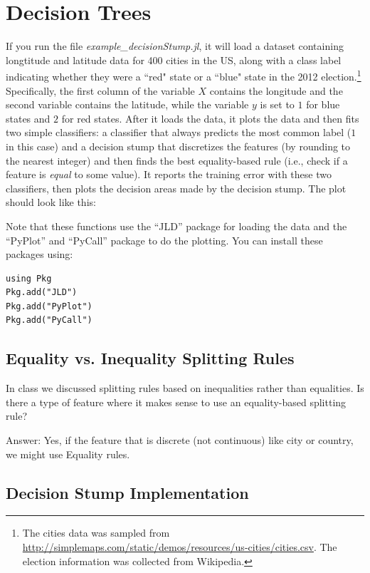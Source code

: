 \documentclass{article}
\def\ans#1{\par\gre{Answer: #1}}
\def\blu#1{{\color{blu}#1}}
\def\gre#1{{\color{gre}#1}}
\begin{document}
\section{Decision Trees}

If you run the file \emph{example\_decisionStump.jl}, it will load a dataset containing longtitude and latitude data for 400 cities in the US, along with a class label indicating whether they were a ``red" state or a ``blue" state in the 2012 election.\footnote{The cities data was sampled from \url{http://simplemaps.com/static/demos/resources/us-cities/cities.csv}. The election information was collected from Wikipedia.} Specifically, the first column of the variable $X$ contains the longitude and the second variable contains the latitude, while the variable $y$ is set to $1$ for blue states and $2$ for red states. After it loads the data, it plots the data and then fits two simple classifiers: a classifier that always predicts the most common label ($1$ in this case) and a decision stump that discretizes the features (by rounding to the nearest integer) and then finds the best equality-based rule (i.e., check if a feature is \emph{equal} to some value). It reports the training error with these two classifiers, then plots the decision areas made by the decision stump. The plot should look like this:

Note that these functions use the ``JLD'' package for loading the data and the ``PyPlot'' and ``PyCall'' package to do the plotting. You can install these packages using:
\begin{verbatim}
using Pkg
Pkg.add("JLD")
Pkg.add("PyPlot")
Pkg.add("PyCall")
\end{verbatim}

\subsection{Equality vs. Inequality Splitting Rules}

In class we discussed splitting rules based on inequalities rather than equalities. \blu{Is there a type of feature where it makes sense to use 
an equality-based splitting rule?}
\ans{Yes, if the feature that is discrete (not continuous) like city or country, we might use Equality rules.}



\subsection{Decision Stump Implementation}
\end{document}
